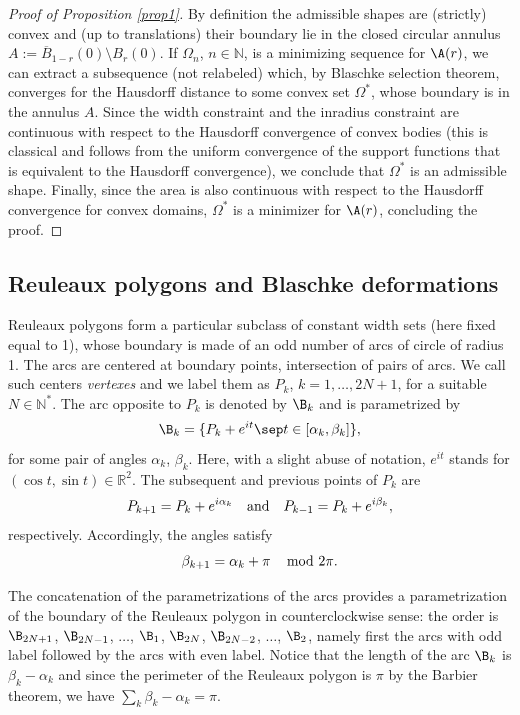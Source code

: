\begin{proof}[Proof of Proposition \ref{prop1}]
By definition the admissible shapes are (strictly) convex and (up to translations) their boundary lie in the closed circular annulus $A:=\overline{B}_{1-r}(0)\setminus B_r(0)$.
If $\Omega_n$, $n\in \mathbb N$, is a minimizing sequence for $\A(r)$, we can extract a subsequence (not relabeled) which, by Blaschke selection theorem, converges for the Hausdorff distance to some convex set $\Omega^*$, whose boundary is in the annulus $A$.
{Since the width constraint and the inradius constraint are continuous with respect to the Hausdorff convergence of convex bodies (this is classical and follows from the uniform convergence
of the support functions that is equivalent to the Hausdorff convergence), we conclude that $\Omega^*$ is an admissible shape.} Finally, since the area is also continuous with respect to the Hausdorff convergence for convex domains, $\Omega^*$ is a minimizer for $\A(r)$, concluding the proof.
\end{proof}

\subsection{Reuleaux polygons and Blaschke deformations}

Reuleaux polygons form a particular subclass of constant width sets (here fixed equal to 1), whose boundary is made of an odd number of arcs of circle of radius 1.
The arcs are centered at boundary points, intersection of pairs of arcs. We call such centers \emph{vertexes} and we label them as $P_k$, $k=1,\ldots, 2N+1$, for a suitable $N\in \mathbb N^*$. The arc opposite to $P_k$ is denoted by $\B_k$ and is parametrized by
\[
\B_k=\{P_k + e^{it}\sep t\in [\alpha_k, \beta_k]\},
\]
for some pair of angles $\alpha_k$, $\beta_k$. Here, with a slight abuse of notation, $e^{it}$ stands for $(\cos t, \sin t)\in \mathbb R^2$. The subsequent and previous points of $P_k$ are
\[
P_{k+1}=P_k + e^{i\alpha_k}\quad \hbox{and}\quad P_{k-1}=P_{k} + e^{i\beta_k},
\]
respectively. Accordingly, the angles satisfy
\[
\beta_{k+1}= \alpha_k +\pi \,\quad \hbox{mod }2\pi.
\]

The concatenation of the parametrizations of the arcs provides a parametrization of the boundary of the Reuleaux polygon in counterclockwise sense: the order is $\B_{2N+1}$, $\B_{2N-1}$, $\ldots$, $\B_{1}$, $\B_{2N}$, $\B_{2N-2}$, $\ldots$, $\B_2$, namely first the arcs with odd label followed by the arcs with even label.
Notice that the length of the arc $\B_k$ is $\beta_k-\alpha_k$ and since the perimeter of the Reuleaux polygon is $\pi$ by the Barbier theorem, we have $\sum_k \beta_k - \alpha_k =\pi$.

